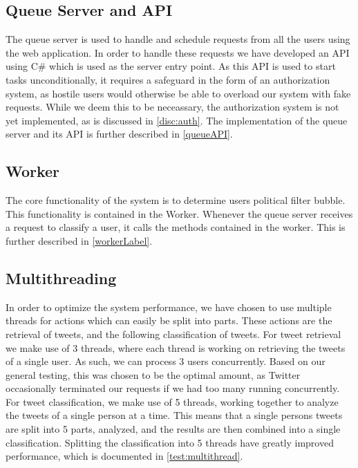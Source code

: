 \subsection{Queue Server and API}
The queue server is used to handle and schedule requests from all the users
using the web application. In order to handle these requests we have developed
an API using C\# which is used as the server entry point. As this API is used to
start tasks unconditionally, it requires a safeguard in the form of an
authorization system, as hostile users would otherwise be able to overload our
system with fake requests. While we deem this to be neceassary, the
authorization system is not yet implemented, as is discussed in
\autoref{disc:auth}. The implementation of the queue server and its API is
further described in \autoref{queueAPI}.

\subsection{Worker}
The core functionality of the system is to determine users political filter
bubble. This functionality is contained in the Worker. Whenever the queue server
receives a request to classify a user, it calls the methods contained in the
worker. This is further described in \autoref{workerLabel}.

\subsection{Multithreading}\label{subs:multithread}
In order to optimize the system performance, we have chosen to use multiple
threads for actions which can easily be split into parts. These actions are the
retrieval of tweets, and the following classification of tweets. For tweet
retrieval we make use of 3 threads, where each thread is working on retrieving
the tweets of a single user. As such, we can process 3 users concurrently. Based
on our general testing, this was chosen to be the optimal amount, as Twitter
occasionally terminated our requests if we had too many running concurrently.\\
For tweet classification, we make use of 5 threads, working together to analyze
the tweets of a single person at a time. This means that a single persons tweets
are split into 5 parts, analyzed, and the results are then combined into a
single classification. Splitting the classification into 5 threads have greatly
improved performance, which is documented in \autoref{test:multithread}.

